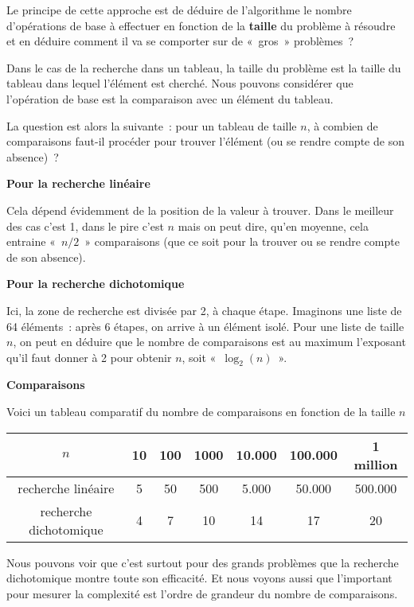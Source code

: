 			Le principe de cette approche est de déduire de l'algorithme le
			nombre d’opérations de base à effectuer en fonction de la
			\textbf{taille} du problème à résoudre et en déduire comment il va
			se comporter sur de «~gros~» problèmes~?
		
			Dans le cas de la recherche dans un tableau, la taille du problème
			est la taille du tableau dans lequel l'élément est cherché.  Nous
			pouvons considérer que l’opération de base est la comparaison avec
			un élément du tableau. 
			
			La question est alors la suivante~: pour un tableau de taille $n$,
			à combien de comparaisons faut-il procéder pour trouver l’élément
			(ou se rendre compte de son absence)~?
		
			\clearpage
			{\bfseries
			Pour la recherche linéaire}
		
				Cela dépend évidemment de la position de la valeur à trouver. 
				Dans le meilleur des cas c’est 1, 
				dans le pire c’est $n$ mais on peut dire, 
				qu’en moyenne, 
				cela entraine «~$n/2$~» comparaisons 
				(que ce soit pour la trouver ou se rendre compte de son absence).
		
			{\bfseries
			Pour la recherche dichotomique}
		
				Ici, la zone de recherche est divisée par 2, à chaque étape. 
				Imaginons une liste de 64 éléments~: 
				après 6 étapes, on arrive à un élément isolé. 
				Pour une liste de taille $n$, 
				on peut en déduire que le nombre de comparaisons 
				est au maximum l’exposant qu’il faut donner à 2 pour obtenir $n$, 
				soit «~$\log_2(n)$~».
		
			{\sffamily\bfseries\upshape
			Comparaisons}
		
			Voici un tableau comparatif du nombre de comparaisons en fonction de
			la taille $n$
		
			\begin{center}
				\small
				\begin{tabular}{|c|c|c|c|c|c|c|}
			\hline
			\rowcolor{black!40}
			$n$ & 10 & 100 & 1000 & 10.000 & 100.000 & 1 million \\
			\hline
			recherche linéaire & 5 & 50 & 500 & 5.000 & 50.000 & 500.000 \\
			\hline
			recherche dichotomique & 4 & 7 & 10 & 14 & 17 & 20 \\
			\hline
			\end{tabular}
			\end{center}
			
			Nous pouvons voir que c’est surtout pour des grands problèmes que la
			recherche dichotomique montre toute son efficacité.  Et nous voyons
			aussi que l'important pour mesurer la complexité est l’ordre de
			grandeur du nombre de comparaisons. 
		
